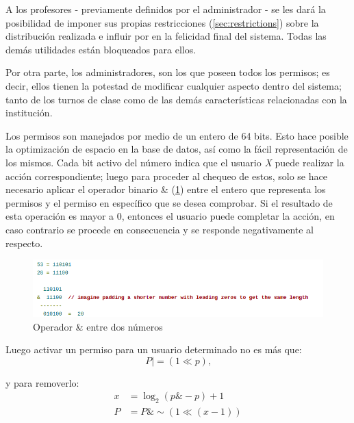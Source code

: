 A los profesores - previamente definidos por el administrador - se les dará la posibilidad de imponer sus propias restricciones (\ref{sec:restrictions}) sobre la distribución realizada e influir por en la felicidad final del sistema. Todas las demás utilidades están bloqueados para ellos.

Por otra parte, los administradores, son los que poseen todos los permisos; es decir, ellos tienen la potestad de modificar cualquier aspecto dentro del sistema; tanto de los turnos de clase como de las demás características relacionadas con la institución.

Los permisos son manejados por medio de un entero de 64 bits. Esto hace posible la optimización de espacio en la base de datos, así como la fácil representación de los mismos. Cada bit activo del número indica que el usuario \textit{X} puede realizar la acción correspondiente; luego para proceder al chequeo de estos, solo se hace necesario aplicar el operador binario \& (\ref{fig:and}) entre el entero que representa los permisos y el permiso en específico que se desea comprobar. Si el resultado de esta operación es mayor a 0, entonces el usuario puede completar la acción, en caso contrario se procede en consecuencia  y se responde negativamente al respecto.

\begin{figure}[h!]
	\centering
	\includegraphics[width=0.95\linewidth]{images/Chapter 3/and}
	\caption{Operador \& entre dos números \cite{codeforces}}
	\label{fig:and}
\end{figure}

\noindent Luego activar un permiso para un usuario determinado no es más que: \\
\begin{equation}
	P \mid= (1 \ll p) \text{,}
\end{equation}

\noindent y para removerlo:\\
\begin{equation}
	\begin{split}	
		x & = \log_{2}(p \& -p) + 1  \\
		P & = P \& \sim(1 \ll (x - 1))
	\end{split}
\end{equation}

